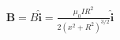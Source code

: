 \documentclass[preview]{standalone}
\begin{document}
\begin{align*}
\mathbf{B} = B \hat{\mathbf{i}} = \frac{\mu_0 IR^2}{2 (x^2 + R^2)^{3/2}} \hat{\mathbf{i}}
\end{align*}
\end{document}
